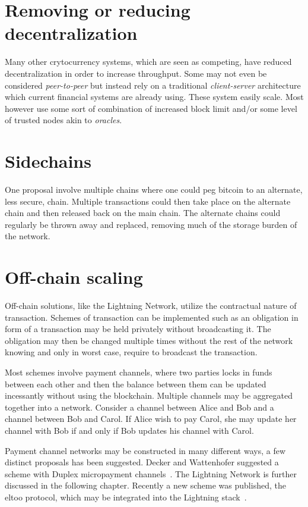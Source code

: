 \section{Removing or reducing decentralization}

Many other crytocurrency systems, which are seen as competing, have reduced decentralization in order to increase throughput. Some may not even be considered \textit{peer-to-peer} but instead rely on a traditional \textit{client-server} architecture which current financial systems are already using. These system easily scale. Most however use some sort of combination of increased block limit and/or some level of trusted nodes akin to \textit{oracles}.  

\section{Sidechains}

One proposal involve multiple chains where one could peg bitcoin to an alternate, less secure, chain. Multiple transactions could then take place on the alternate chain and then released back on the main chain. The alternate chains could regularly be thrown away and replaced, removing much of the storage burden of the network.~\cite{blockstream:sidechain}

\section{Off-chain scaling}

Off-chain solutions, like the Lightning Network, utilize the contractual nature of transaction. Schemes of transaction can be implemented such as an obligation in form of a transaction may be held privately without broadcasting it. The obligation may then be changed multiple times without the rest of the network knowing and only in worst case, require to broadcast the transaction. 

Most schemes involve payment channels, where two parties locks in funds between each other and then the balance between them can be updated incessantly without using the blockchain. Multiple channels may be aggregated together into a network. Consider a channel between Alice and Bob and a channel between Bob and Carol. If Alice wish to pay Carol, she may update her channel with Bob if and only if Bob updates his channel with Carol.  

Payment channel networks may be constructed in many different ways, a few distinct proposals has been suggested. Decker and Wattenhofer suggested a scheme with Duplex micropayment channels~\cite{decker:wattenhofer:duplex}. The Lightning Network is further discussed in the following chapter. Recently a new scheme was published, the eltoo protocol, which may be integrated into the Lightning stack~\cite{decker:russell:Osuntokun:eltoo}.   


